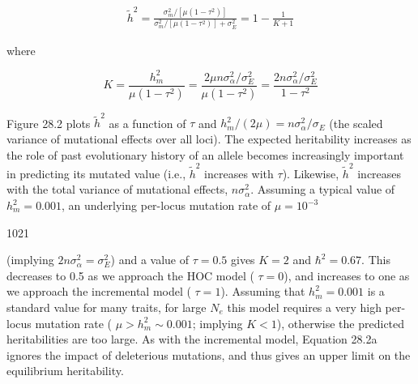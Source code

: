 \documentclass{article}
\begin{document}
\begin{equation}
\begin{align*}\widetilde h^2=\frac{\sigma_m^2/[\mu(1-\tau^2)]}{\sigma_m^2/[\mu(1-\tau^2)]+\sigma_E^2}=1-\frac{1}{K+1}\end{align*}
\tag{28.2a}
\label{eq:28_2a}
\end{equation}

where

\begin{equation}
K=\frac{h_{m}^{2}}{\mu(1-\tau^{2})}=\frac{2\mu n\sigma_{\alpha}^{2}/\sigma_{E}^{2}}{\mu(1-\tau^{2})}=\frac{2n\sigma_{\alpha}^{2}/\sigma_{E}^{2}}{1-\tau^{2}}
\tag{28.2b}
\label{eq:28_2b}
\end{equation}

Figure 28.2 plots  $ \tilde{h}^2 $ as a function of  $ \tau $ and  $ h_m^2/(2\mu) = n\sigma_\alpha^2/\sigma_E $ (the scaled variance of mutational effects over all loci). The expected heritability increases as the role of past evolutionary history of an allele becomes increasingly important in predicting its mutated value (i.e.,  $ \tilde{h}^2 $ increases with  $ \tau $). Likewise,  $ \tilde{h}^2 $ increases with the total variance of mutational effects,  $ n\sigma_\alpha^2 $. Assuming a typical value of  $ h_m^2 = 0.001 $, an underlying per-locus mutation rate of  $ \mu = 10^{-3} $

1021

(implying  $ 2n\sigma_\alpha^2 = \sigma_E^2 $) and a value of  $ \tau = 0.5 $ gives  $ K = 2 $ and  $ \hbar^2 = 0.67 $. This decreases to 0.5 as we approach the HOC model ( $ \tau = 0 $), and increases to one as we approach the incremental model ( $ \tau = 1 $). Assuming that  $ h_m^2 = 0.001 $ is a standard value for many traits, for large  $ N_e $ this model requires a very high per-locus mutation rate ( $ \mu > h_m^2 \sim 0.001 $; implying  $ K < 1 $), otherwise the predicted heritabilities are too large. As with the incremental model, Equation 28.2a ignores the impact of deleterious mutations, and thus gives an upper limit on the equilibrium heritability.
\end{document}
